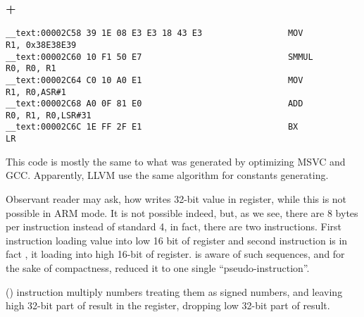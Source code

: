 \subsubsection{\OptimizingXcode + \ARMMode}

\begin{lstlisting}
__text:00002C58 39 1E 08 E3 E3 18 43 E3                 MOV             R1, 0x38E38E39
__text:00002C60 10 F1 50 E7                             SMMUL           R0, R0, R1
__text:00002C64 C0 10 A0 E1                             MOV             R1, R0,ASR#1
__text:00002C68 A0 0F 81 E0                             ADD             R0, R1, R0,LSR#31
__text:00002C6C 1E FF 2F E1                             BX              LR
\end{lstlisting}

{This code is mostly the same to what was generated by optimizing MSVC and GCC.}
{Apparently, LLVM use the same algorithm for constants generating.}

{Observant reader may ask, how \MOV writes 32-bit value in register, while this is not possible in ARM mode.}
{It is not possible indeed, but, as we see,
there are 8 bytes per instruction instead of standard 4,
in fact, there are two instructions.}
{First instruction loading  value into low 16 bit of register and second instruction is in fact
, it loading  into high 16-bit of register.}
\IDA {}
{is aware of such sequences, and for the sake of compactness, reduced it to one single ``pseudo-instruction''.}

 () 
{instruction multiply numbers treating them as signed numbers,
and leaving high 32-bit part of result in the \Rzero register,
dropping low 32-bit part of result.}

